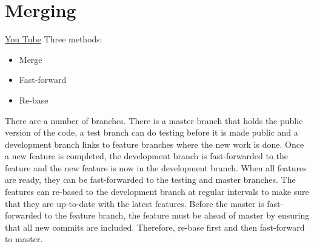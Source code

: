 \documentclass[11pt]{article} %
\begin{document}
\section{Merging}
\href{https://www.youtube.com/watch?v=to6tIdy5rNc&feature=em-subs_digest-wl}{You Tube}
Three methods:
\begin{itemize}
\item Merge
\item Fast-forward
\item Re-base
\end{itemize}

There are a number of branches. There is a master branch that holds the public version of the code, a test branch can do testing before it is made public and a development branch links to feature branches where the new work is done.  Once a new feature is completed, the development branch is fast-forwarded to the feature and the new feature is now in the development branch.  When all features are ready, they can be fast-forwarded to the testing and master branches.  The features can re-based to the development branch at regular intervals to make sure
that they are up-to-date with the latest features. Before the master is fast-forwarded to the feature branch, the feature must be ahead of master by ensuring that all new commits are included. Therefore, re-base first and then fast-forward to master. 
\end{document}
